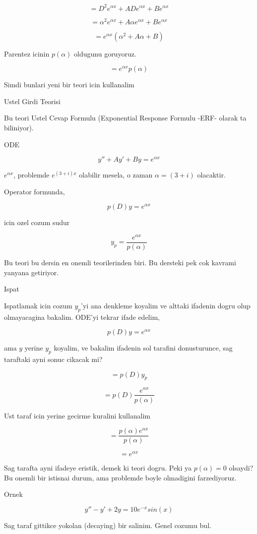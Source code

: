 \documentclass[12pt,fleqn]{article}
\begin{document}
\[ = D^2e^{\alpha x} + ADe^{\alpha x} + Be^{\alpha x} \]

\[ = \alpha^2 e^{\alpha x} + A \alpha e^{\alpha x} + Be^{\alpha x} \]

\[ = e^{\alpha x}(\alpha^2  + A \alpha + B)\]

Parentez icinin $p(\alpha)$ oldugunu goruyoruz. 

\[ = e^{\alpha x}p(\alpha)\]

Simdi bunlari yeni bir teori icin kullanalim

Ustel Girdi Teorisi 

Bu teori Ustel Cevap Formulu (Exponential Response Formulu -ERF- olarak ta
biliniyor).

ODE

\[ y'' + Ay' + By = e^{\alpha x} \]

$e^{\alpha x}$, problemde $e^{(3+i)x}$ olabilir mesela, o zaman $\alpha
= (3+i)$ olacaktir. 

Operator formunda,

\[ p(D)y = e^{\alpha x} \]

icin ozel cozum sudur

\[ y_p = \frac{e^{\alpha x}}{p(\alpha)} \]

Bu teori bu dersin en onemli teorilerinden biri. Bu dersteki pek cok
kavrami yanyana getiriyor. 

Ispat

Ispatlamak icin cozum $y_p$'yi ana denkleme koyalim ve alttaki ifadenin dogru
olup olmayacagina bakalim. ODE'yi tekrar ifade edelim, 

\[ p(D)y =  e^{\alpha x} \]

ama $y$ yerine $y_p$ koyalim, ve bakalim ifadenin sol tarafini
donusturunce, sag taraftaki ayni sonuc cikacak mi?

\[ = p(D)y_p\]

\[ = p(D)\frac{e^{\alpha x}}{p(\alpha)}  \]

Ust taraf icin yerine gecirme kuralini kullanalim

\[ = \frac{p(\alpha)e^{\alpha x}}{p(\alpha)} \]

\[ = e^{\alpha x} \]

Sag tarafta ayni ifadeye eristik, demek ki teori dogru. Peki ya $p(\alpha)
= 0$ olsaydi? 
Bu onemli bir istisnai durum, ama problemde boyle olmadigini farzediyoruz.

Ornek 

\[ y'' - y' + 2y = 10e^{-x}sin(x) \]

Sag taraf gittikce yokolan (decaying) bir salinim. Genel cozumu bul.
\end{document}
